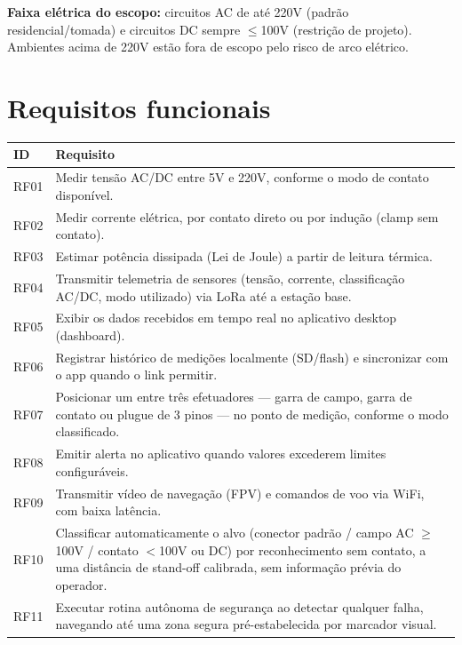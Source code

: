\documentclass[11pt,a4paper]{article}
\begin{document}
\textbf{Faixa elétrica do escopo:} circuitos AC de até 220V (padrão residencial/tomada) e circuitos DC sempre $\leq$100V (restrição de projeto). Ambientes acima de 220V estão fora de escopo pelo risco de arco elétrico.

\section{Requisitos funcionais}

\begin{longtable}{@{}p{1.6cm}p{12.6cm}@{}}
\toprule
\textbf{ID} & \textbf{Requisito} \\
\midrule
\endhead
\bottomrule
\endfoot
RF01 & Medir tensão AC/DC entre 5V e 220V, conforme o modo de contato disponível. \\
RF02 & Medir corrente elétrica, por contato direto ou por indução (clamp sem contato). \\
RF03 & Estimar potência dissipada (Lei de Joule) a partir de leitura térmica. \\
RF04 & Transmitir telemetria de sensores (tensão, corrente, classificação AC/DC, modo utilizado) via LoRa até a estação base. \\
RF05 & Exibir os dados recebidos em tempo real no aplicativo desktop (dashboard). \\
RF06 & Registrar histórico de medições localmente (SD/flash) e sincronizar com o app quando o link permitir. \\
RF07 & Posicionar um entre três efetuadores — garra de campo, garra de contato ou plugue de 3 pinos — no ponto de medição, conforme o modo classificado. \\
RF08 & Emitir alerta no aplicativo quando valores excederem limites configuráveis. \\
RF09 & Transmitir vídeo de navegação (FPV) e comandos de voo via WiFi, com baixa latência. \\
RF10 & Classificar automaticamente o alvo (conector padrão / campo AC $\geq$100V / contato $<$100V ou DC) por reconhecimento sem contato, a uma distância de stand-off calibrada, sem informação prévia do operador. \\
RF11 & Executar rotina autônoma de segurança ao detectar qualquer falha, navegando até uma zona segura pré-estabelecida por marcador visual. \\
\end{longtable}
\end{document}
